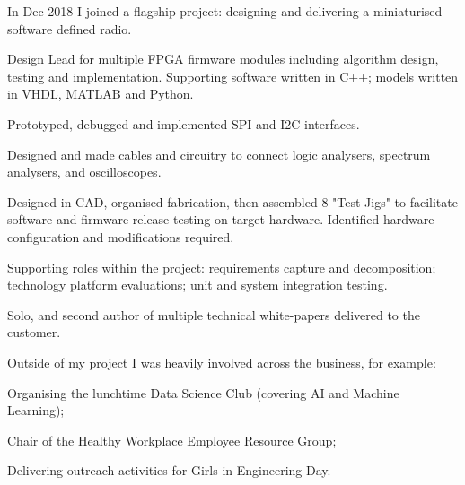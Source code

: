 {}

\vspace{0.5em}
In Dec 2018 I joined a flagship project: designing and delivering a miniaturised software defined radio.
\begin{tightemize}
  \item Design Lead for multiple FPGA firmware modules including algorithm design, testing and implementation. Supporting software written in C++; models written in VHDL, MATLAB and Python.
  \item Prototyped, debugged and implemented SPI and I2C interfaces.
  \item Designed and made cables and circuitry to connect logic analysers, spectrum analysers, and oscilloscopes.
  \item Designed in CAD, organised fabrication, then assembled 8 "Test Jigs" to facilitate software and firmware release testing on target hardware. Identified hardware configuration and modifications required.
  \item Supporting roles within the project: requirements capture and decomposition; technology platform evaluations; unit and system integration testing.
  \item Solo, and second author of multiple technical white-papers delivered to the customer.
\end{tightemize}

\vspace{0.5em}
Outside of my project I was heavily involved across the business, for example:
\begin{tightemize}
    \item Organising the lunchtime Data Science Club (covering AI and Machine Learning);
    \item Chair of the Healthy Workplace Employee Resource Group;
    \item Delivering outreach activities for Girls in Engineering Day.
\end{tightemize}

\sectionsep
